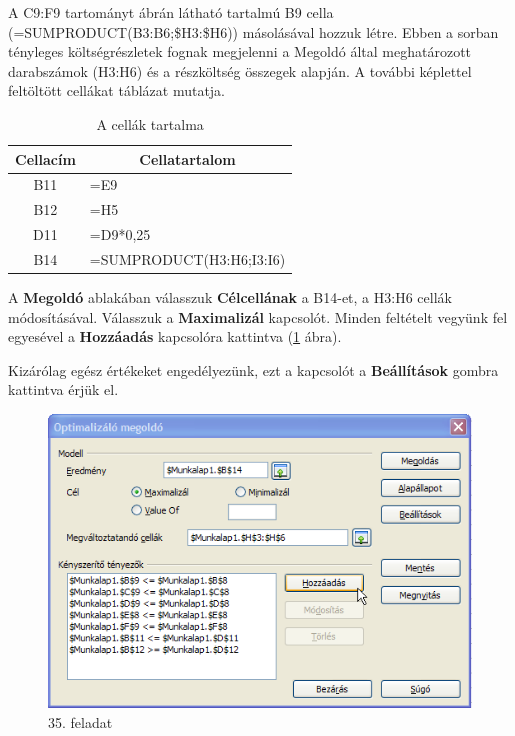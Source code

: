 A C9:F9 tartományt  ábrán látható tartalmú B9 cella
\textsf{(=SUMPRODUCT(B3:B6;\$H3:\$H6))} másolásával hozzuk létre.
Ebben a sorban tényleges
költségrészletek fognak megjelenni a Megoldó által
meghatározott darabszámok (H3:H6) és a részköltség
összegek alapján. A további képlettel feltöltött cellákat
 táblázat mutatja.

\begin{table}[!h]
\begin{center}
\caption{A cellák tartalma}\label{Feltöltés}
\begin{tabular}{|c|l|}
\hline
\textbf{Cellacím}&
\multicolumn{1}{|c|}{\textbf{Cellatartalom}}\\ \hline
B11 & \sffamily =E9\\ \hline
B12 & \sffamily =H5\\ \hline
D11 & \sffamily =D9*0,25\\ \hline
B14 & \sffamily =SUMPRODUCT(H3:H6;I3:I6)\\ \hline
\end{tabular}
\end{center}
\end{table}

A \textbf{Megoldó} ablakában válasszuk \textbf{Célcellának} a
B14-et, a H3:H6 cellák módosításával. Válasszuk a
\textbf{Maximalizál} kapcsolót. Minden feltételt vegyünk fel
egyesével a \textbf{Hozzáadás} kapcsolóra kattintva (\ref{35-feladat2}
ábra).

Kizárólag egész értékeket engedélyezünk, ezt a kapcsolót
a \textbf{Beállítások} gombra kattintva érjük el.

\begin{figure}[!h]
\begin{center}
\includegraphics[width=12.598cm]{oocalcv1-img171.png}
\caption{35. feladat}\label{35-feladat2}
\end{center}
\end{figure}

